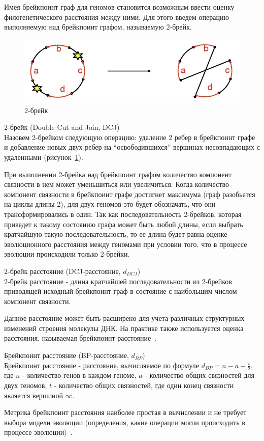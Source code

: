 Имея брейкпоинт граф для геномов становится возможным ввести оценку филогенетического расстояния между ними.
Для этого введем операцию выполняемую над брейкпоинт графом, называемую 2-брейк.
\begin{figure}[H]
  \centering
  \includegraphics[max width=0.5\linewidth]{fig/1/2break.jpg}
  \caption{2-брейк}
  \label{fig:2break}
\end{figure}
\begin{define}{2-брейк (Double Cut and Join, DCJ)} \\
  Назовем 2-брейком следующую операцию: удаление 2 ребер в брейкпоинт графе и добавление новых двух ребер на ``освободившихся'' вершинах
  несовпадающих с удаленными (рисунок~\ref{fig:2break}).
\end{define}
При выполнении 2-брейка над брейкпоинт графом количество компонент связности в нем может уменьшиться или увеличиться.
Когда количество компонент связности в брейкпоинт графе достигнет максимума (граф разобьется на циклы длины 2),
для двух геномов это будет обозначать, что они трансформировались в один.
Так как последовательность 2-брейков, которая приведет к такому состоянию графа может быть любой длины, если выбрать кратчайшую такую последовательность,
то ее длина будет равна оценке эволюционного расстояния между геномами при условии того, что в процессе эволюции происходили только 2-брейки.
\begin{define}{2-брейк расстояние (DCJ-расстояние, $d_{DCJ}$)} \\
  2-брейк расстояние - длина кратчайшей последовательности из 2-брейков приводящей
  исходный брейкпоинт граф в состояние с наибольшим числом компонент связности.
\end{define}

Данное расстояние может быть расширено для учета различных структурных изменений строения молекулы ДНК.
На практике также используется оценка расстояния, называемая брейкпоинт расстояние~\cite{blanchette1997breakpoint}.

\begin{define}{Брейкпоинт расстояние (BP-расстояние, $d_{BP}$)} \\
  Брейкпоинт расстояние - расстояние, вычисляемое по формуле $d_{BP} = n - a - \frac{t}{2}$,
  где $n$ - количество генов в каждом геноме,
  $a$ - количество общих связностей для двух геномов, $t$ - количество
  общих связностей, где один конец связности является вершиной $\infty$.
\end{define}
Метрика брейкпоинт расстояния наиболее простая в вычислении и не требует выбора модели эволюции
(определения, какие операции могли происходить в процессе эволюции)~\cite{blanchette1997breakpoint}.

